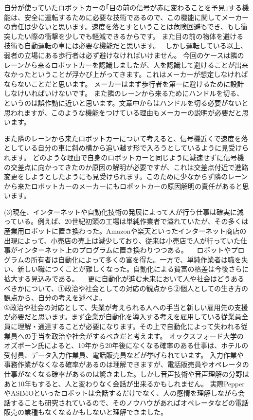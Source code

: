 \documentclass[11pt,a4paper]{jsarticle}
\begin{document}
自分が使っていたロボットカーの｢目の前の信号が赤に変わることを予見｣する機能は、安全に運転するために必要な技術であるので、この機能に関してメーカーの責任は少ないと思います。速度を落とすということは危険回避もでき、もし衝突したい際の衝撃を少しでも軽減できるからです。
また目の前の物体を避ける技術も自動運転の車には必要な機能だと思います。　
しかし運転している以上、弱者の立場にある歩行者は必ず避けなければいけません。
今回のケースは隣のレーンから来るロボットカーを認識しましたが、人を認識して避けることが出来なかったということが浮かび上がってきます。これはメーカーが想定しなければならないことだと思います。
メーカーはまず歩行者を第一に避けるために設計しなけいればいけないです。
また隣のレーンから来るためにハンドルを切る、というのは誤作動に近いと思います。文章中からはハンドルを切る必要がないと思われますが、このような機能をつけている理由もメーカーの説明が必要だと思います。

また隣のレーンから来たロボットカーについて考えると、信号機近くで速度を落としている自分の車に斜め横から追い越す形で入ろうとしているように見受けられます。
どのような理由で自身のロボットカーと同じように減速せずに信号機の交差点に向かってきたのか原因の解明が必要ですが、これは交差点付近で進路変更をしようとしたようにも見受けられます。このために少なからず隣のレーンから来たロボットカーのメーカーにもロボットカーの原因解明の責任があると思います。

\newpage

 (3)現在、インターネットや自動化技術の発展によって人が行う仕事は確実に減っている。例えば、20世紀初頭の工場は単純作業者で溢れていたが、その多くは産業用ロボットに置き換わった。Amazonや楽天といったインターネット商店の出現によって、小売店の売上は減少しており、従来は小売店で人が行っていた仕事がインターネット上のプログラムに置き換わりつつある。
　ロボットやプログラムの所有者は自動化によって多くの富を得た。一方で、単純作業者は職を失い、新しい職につくことが難しくなった。自動化による貧富の格差は今後さらに拡大する見込みである。
　更に自動化が進む未来において人や社会はどうあるべきかについて、①政治や社会としての対応の観点から②個人としての生き方の観点から、自分の考えを述べよ。\\
 
①政治や社会の対応として、失業が考えられる人への手当と新しい雇用先の支援が必要だと思います。まず企業が自動化を導入する考えを雇用している従業員全員に理解・通達することが必要になります。その上で自動化によって失われる従業員への手当を政治や社会がするべきだと考えます。
オックスフォード大学のオズボーン氏によると、10年から20年後になくなる確率のある仕事は、ホテルの受付員、データ入力作業員、電話販売員などが挙げられています。
入力作業や事務作業がなくなる確率があるのは理解できますが、電話販売員やオペレータの仕事がなくなる確率があるのは驚きました。しかし音声技術や音声理解の分野はあと10年もすると、人と変わりなく会話が出来るかもしれません。
実際PepperやASIMOといったロボットは会話するだけでなく、人の感情を理解しながら会話することも研究されているので、そのノウハウがあればオペレータなどの電話販売の業種もなくなるかもしないと理解できました。
\end{document}
